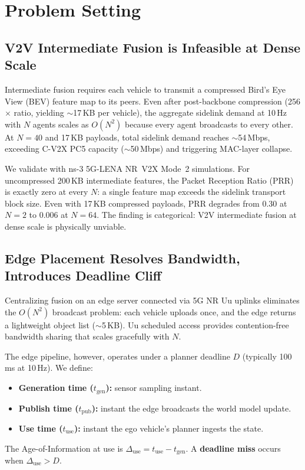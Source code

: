 \section{Problem Setting}
\label{sec:problem}

\subsection{V2V Intermediate Fusion is Infeasible at Dense Scale}

Intermediate fusion requires each vehicle to transmit a compressed
Bird's Eye View (BEV) feature map to its peers.  Even after
post-backbone compression (256$\times$ ratio, yielding
$\sim$17\,KB per vehicle), the aggregate sidelink demand at 10\,Hz with
$N$ agents scales as $O(N^2)$ because every agent broadcasts to every
other.  At $N=40$ and 17\,KB payloads, total sidelink demand reaches
$\sim$54\,Mbps, exceeding C-V2X PC5 capacity ($\sim$50\,Mbps) and
triggering MAC-layer collapse.

We validate with ns-3 5G-LENA NR~V2X Mode~2 simulations.
For uncompressed 200\,KB intermediate features, the Packet Reception
Ratio (PRR) is exactly zero at every $N$: a single feature map exceeds
the sidelink transport block size.  Even with 17\,KB compressed payloads,
PRR degrades from 0.30 at $N=2$ to 0.006 at $N=64$.  The finding is
categorical: V2V intermediate fusion at dense scale is physically
unviable.

\subsection{Edge Placement Resolves Bandwidth, Introduces Deadline Cliff}

Centralizing fusion on an edge server connected via 5G NR Uu uplinks
eliminates the $O(N^2)$ broadcast problem: each vehicle uploads once,
and the edge returns a lightweight object list ($\sim$5\,KB).
Uu scheduled access provides contention-free bandwidth sharing that
scales gracefully with $N$.

The edge pipeline, however, operates under a planner deadline
$D$ (typically 100\,ms at 10\,Hz).  We define:
\begin{itemize}
  \item \textbf{Generation time ($t_{\mathrm{gen}}$):} sensor
    sampling instant.
  \item \textbf{Publish time ($t_{\mathrm{pub}}$):} instant the edge
    broadcasts the world model update.
  \item \textbf{Use time ($t_{\mathrm{use}}$):} instant the ego
    vehicle's planner ingests the state.
\end{itemize}
The Age-of-Information at use is
$\Delta_{\mathrm{use}} = t_{\mathrm{use}} - t_{\mathrm{gen}}$.
A \textbf{deadline miss} occurs when $\Delta_{\mathrm{use}} > D$.


